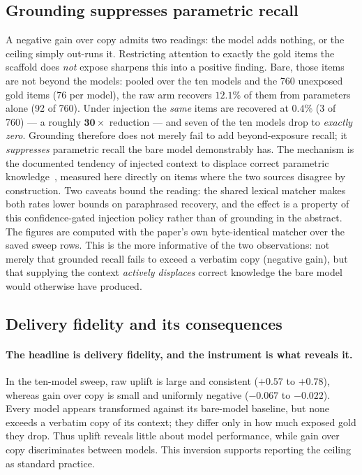 \documentclass[10pt,twocolumn]{article}
\begin{document}
\subsection{Grounding suppresses parametric recall}\label{sec:suppression}
A negative gain over copy admits two readings: the model adds nothing, or the ceiling simply out-runs it. Restricting attention to exactly the gold items the scaffold does \emph{not} expose sharpens this into a positive finding. Bare, those items are not beyond the models: pooled over the ten models and the 760 unexposed gold items (76 per model), the raw arm recovers $\mathbf{12.1\%}$ of them from parameters alone (92 of 760). Under injection the \emph{same} items are recovered at $\mathbf{0.4\%}$ (3 of 760) --- a roughly $\mathbf{30\times}$ reduction --- and seven of the ten models drop to \emph{exactly zero}. Grounding therefore does not merely fail to add beyond-exposure recall; it \emph{suppresses} parametric recall the bare model demonstrably has. The mechanism is the documented tendency of injected context to displace correct parametric knowledge~\cite{shi2023distracted,yoran2024robust,longpre2021entity}, measured here directly on items where the two sources disagree by construction. Two caveats bound the reading: the shared lexical matcher makes both rates lower bounds on paraphrased recovery, and the effect is a property of this confidence-gated injection policy rather than of grounding in the abstract. The figures are computed with the paper's own byte-identical matcher over the saved sweep rows. This is the more informative of the two observations: not merely that grounded recall fails to exceed a verbatim copy (negative gain), but that supplying the context \emph{actively displaces} correct knowledge the bare model would otherwise have produced.

\subsection{Delivery fidelity and its consequences}
\paragraph{The headline is delivery fidelity, and the instrument is what reveals it.} In the ten-model sweep, raw uplift is large and consistent ($+0.57$ to $+0.78$), whereas gain over copy is small and uniformly negative ($-0.067$ to $-0.022$). Every model appears transformed against its bare-model baseline, but none exceeds a verbatim copy of its context; they differ only in how much exposed gold they drop. Thus uplift reveals little about model performance, while gain over copy discriminates between models. This inversion supports reporting the ceiling as standard practice.
\end{document}
